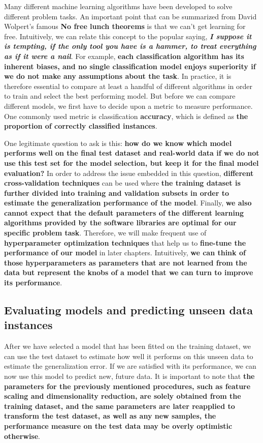 \documentclass[11pt]{article}
\begin{document}
    Many different machine learning algorithms have been developed to solve
different problem tasks. An important point that can be summarized from
David Wolpert's famous \textbf{No free lunch theorems} is that we can't
get learning for free. Intuitively, we can relate this concept to the
popular saying, \textbf{\emph{I suppose it is tempting, if the only tool
you have is a hammer, to treat everything as if it were a nail}}. For
example, \textbf{each classification algorithm has its inherent biases,
and no single classification model enjoys superiority if we do not make
any assumptions about the task}. In practice, it is therefore essential
to compare at least a handful of different algorithms in order to train
and select the best performing model. But before we can compare
different models, we first have to decide upon a metric to measure
performance. One commonly used metric is classification
\textbf{accuracy}, which is defined as \textbf{the proportion of
correctly classified instances}.

    One legitimate question to ask is this: \textbf{how do we know which
model performs well on the final test dataset and real-world data if we
do not use this test set for the model selection, but keep it for the
final model evaluation?} In order to address the issue embedded in this
question, \textbf{different cross-validation techniques} can be used
where \textbf{the training dataset is further divided into training and
validation subsets in order to estimate the generalization performance
of the model}. Finally, \textbf{we also cannot expect that the default
parameters of the different learning algorithms provided by the software
libraries are optimal for our specific problem task}. Therefore, we will
make frequent use of \textbf{hyperparameter optimization techniques}
that help us to \textbf{fine-tune the performance of our model} in later
chapters. Intuitively, \textbf{we can think of those hyperparameters as
parameters that are not learned from the data but represent the knobs of
a model that we can turn to improve its performance}.

    \subsection{Evaluating models and predicting unseen data
instances}\label{evaluating-models-and-predicting-unseen-data-instances}

    After we have selected a model that has been fitted on the training
dataset, we can use the test dataset to estimate how well it performs on
this unseen data to estimate the generalization error. If we are
satisfied with its performance, we can now use this model to predict
new, future data. It is important to note that \textbf{the parameters
for the previously mentioned procedures, such as feature scaling and
dimensionality reduction, are solely obtained from the training dataset,
and the same parameters are later reapplied to transform the test
dataset, as well as any new samples, the performance measure on the test
data may be overly optimistic otherwise}.
\end{document}
